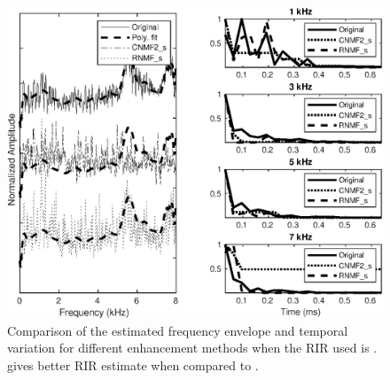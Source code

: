 \begin{figure}[h]
\includegraphics[width = \linewidth]{fig/RIR_comparison_SpkId_12_RIR_cond_RIR_SimRoom3_far_AnglA_StationaryNoise_10dB.eps}
\caption{Comparison of the estimated frequency envelope and temporal variation for different enhancement methods when the RIR used is .  gives better RIR estimate when compared to .}
\label{fig:RIR_spectrogram_comparison}
\end{figure}
\iffalse
